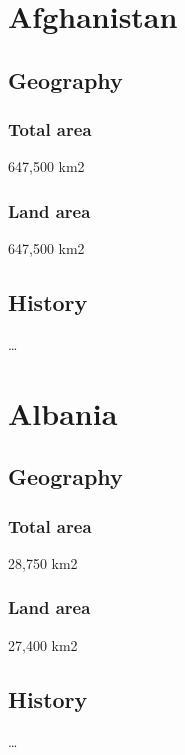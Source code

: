 \documentclass{article}
\begin{document}
\dosecttoc[e] \faketableofcontents

\section{Afghanistan} \secttoc
\subsection{Geography}
\subsubsection{Total area}
    647,500 km2
\subsubsection{Land area}
    647,500 km2
\subsection{History} \ldots

\section{Albania} \secttoc
\subsection{Geography}
\subsubsection{Total area}
    28,750 km2
\subsubsection{Land area}
    27,400 km2
\subsection{History} \ldots
\end{document}
